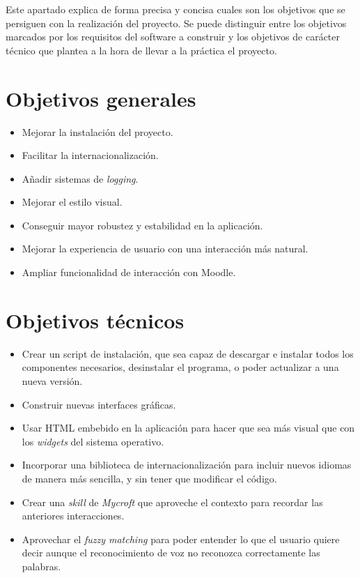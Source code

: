 
Este apartado explica de forma precisa y concisa cuales son los objetivos que se persiguen con la realización del proyecto. Se puede distinguir entre los objetivos marcados por los requisitos del software a construir y los objetivos de carácter técnico que plantea a la hora de llevar a la práctica el proyecto.

\section*{Objetivos generales}
\begin{itemize}
    \item Mejorar la instalación del proyecto.
    \item Facilitar la internacionalización.
    \item Añadir sistemas de \textit{logging}.
    \item Mejorar el estilo visual.
    \item Conseguir mayor robustez y estabilidad en la aplicación.
    \item Mejorar la experiencia de usuario con una interacción más natural.
    \item Ampliar funcionalidad de interacción con Moodle.
\end{itemize}

\section*{Objetivos técnicos}
\begin{itemize}
    \item Crear un script de instalación, que sea capaz de descargar e instalar todos los componentes necesarios, desinstalar el programa, o poder actualizar a una nueva versión.
    \item Construir nuevas interfaces gráficas.
    \item Usar HTML embebido en la aplicación para hacer que sea más visual que con los \textit{widgets} del sistema operativo.
    \item Incorporar una biblioteca de internacionalización para incluir nuevos idiomas de manera más sencilla, y sin tener que modificar el código.
    \item Crear una \textit{skill} de \textit{Mycroft} que aproveche el contexto para recordar las anteriores interacciones.
    \item Aprovechar el \textit{fuzzy matching} para poder entender lo que el usuario quiere decir aunque el reconocimiento de voz no reconozca correctamente las palabras.
\end{itemize}
